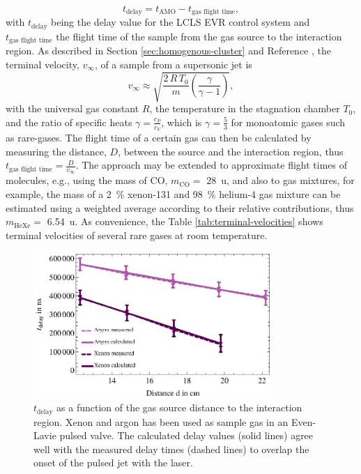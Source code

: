 \begin{equation}
t_{\text{delay}} = t_{\text{AMO}} - t_{\text{gas flight time}},
\label{eqn:sample-jet-delay-time}
\end{equation}
with $t_{\text{delay}}$ being the delay value for the LCLS EVR control system and $t_{\text{gas flight time}}$ the flight time of the sample from the gas source to the interaction region. As described in Section \ref{sec:homogenous-cluster} and Reference \citep{Miller-1988-Oxford}, the terminal velocity, $v_{\infty}$, of a sample from a supersonic jet is
\begin{equation}
 v_{\infty} \approx \sqrt{\frac{2\, R\, T_{0}}{m} \left(\frac{\gamma}{\gamma - 1}\right)},
\label{eqn:terminal-velocity}
\end{equation}
with the universal gas constant $R$, the temperature in the stagnation chamber $T_{0}$, and the ratio of specific heats $\gamma = \frac{c_{P}}{c_{V}}$, which is $\gamma = \frac{5}{3}$ for monoatomic gases such as rare-gases. The flight time of a certain gas can then be calculated by measuring the distance, $D$, between the source and the interaction region, thus $t_{\text{gas flight time}}=\frac{D}{v_{\infty}}$. The approach may be extended to approximate flight times of molecules, e.g., using the mass of CO, $m_{\text{CO}}=$ \SI{28}{\amu}, and also to gas mixtures, for example, the mass of a \SI{2}{\percent} xenon-131 and \SI{98}{\percent} helium-4 gas mixture can be estimated using a weighted average according to their relative contributions, thus  $m_{\text{HeXe}} =$ \SI{6.54}{\amu}. As convenience, the Table \ref{tab:terminal-velocities} shows terminal velocities of several rare gases at room temperature.\\[1\baselineskip]
\begin{figure}
	\centering
		\includegraphics[width=0.80\textwidth]{images/gas-jet-flight-times.eps}
	\caption[Event receiver time delay at LCLS for supersonic gas jets.]{$t_{\text{delay}}$ as a function of the gas source distance to the interaction region. Xenon and argon has been used as sample gas in an Even-Lavie pulsed valve. The calculated delay values (solid lines) agree well with the measured delay times (dashed lines) to overlap the onset of the pulsed jet with the laser.}
	\label{fig:LCLS-delay-data}
\end{figure}
